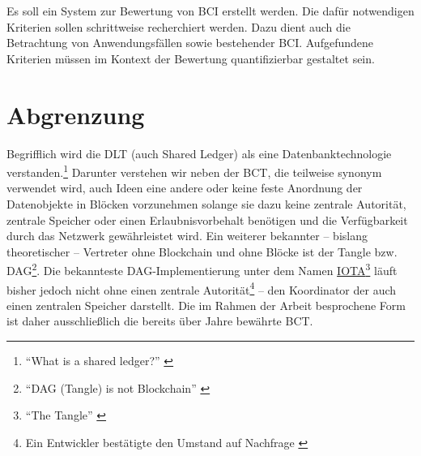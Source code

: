 
Es soll ein System zur Bewertung von \gls{BCI} erstellt werden.
Die dafür notwendigen Kriterien sollen schrittweise recherchiert werden. Dazu dient auch die Betrachtung von Anwendungsfällen sowie bestehender \gls{BCI}.
Aufgefundene Kriterien müssen im Kontext der Bewertung quantifizierbar gestaltet sein.


\section{Abgrenzung}\label{sec:abgrenzung}

Begrifflich wird die \gls{DLT} (auch Shared Ledger) als eine Datenbanktechnologie verstanden.\footnote{\enquote{What is a shared ledger?} \autocite{b:gos-dlt}} Darunter verstehen wir neben der \gls{BCT}, die teilweise synonym verwendet wird, auch Ideen eine andere oder keine feste Anordnung der Datenobjekte in Blöcken vorzunehmen solange sie dazu keine zentrale Autorität, zentrale Speicher oder einen Erlaubnisvorbehalt benötigen und die Verfügbarkeit durch das Netzwerk gewährleistet wird. Ein weiterer bekannter -- bislang theoretischer -- Vertreter ohne Blockchain und ohne Blöcke ist der Tangle bzw. \gls{DAG}\footnote{\enquote{DAG (Tangle) is not Blockchain} \autocite{w:satoshiwatch-dag}}. Die bekannteste \gls{DAG}-Implementierung unter dem Namen \href{https://iota.org/}{IOTA}\footnote{\enquote{The Tangle} \autocite{p:iota}} läuft bisher jedoch nicht ohne einen zentrale Autorität\footnote{Ein Entwickler bestätigte den Umstand auf Nachfrage \autocite{w:iota-centralized}} -- den Koordinator der auch einen zentralen Speicher darstellt.
Die im Rahmen der Arbeit besprochene Form ist daher ausschließlich die bereits über Jahre bewährte \gls{BCT}.

